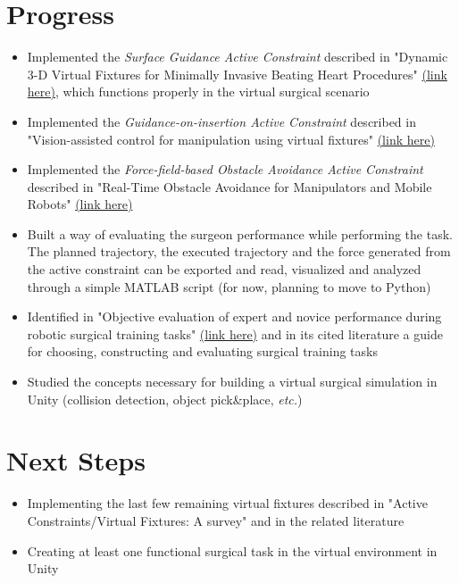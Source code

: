 \documentclass{article}
\begin{document}
\section*{Progress}
    \begin{itemize}
        \item Implemented the \textit{Surface Guidance Active Constraint}
        described in "Dynamic 3-D Virtual Fixtures for Minimally Invasive
        Beating Heart Procedures"
        \href{https://ieeexplore.ieee.org/document/4579344}{(link here)}, which
        functions properly in the virtual surgical scenario
        \item Implemented  the \textit{Guidance-on-insertion Active Constraint}
        described in "Vision-assisted control for manipulation using virtual
        fixtures" \href{https://ieeexplore.ieee.org/document/1362691}{(link
        here)}
        \item Implemented  the \textit{Force-field-based Obstacle Avoidance 
         Active Constraint}
         described in "Real-Time Obstacle Avoidance for Manipulators and Mobile
         Robots"
        \href{https://ieeexplore.ieee.org/document/1087247}{(link
        here)}
        \item Built a way of evaluating the surgeon performance while performing
        the task. The planned trajectory, the executed trajectory and the force
        generated from the active constraint can be exported and read, visualized
        and analyzed through a simple MATLAB script (for now, planning to move
        to Python)
        \item Identified in "Objective evaluation of expert and novice performance
        during robotic surgical training tasks"
        \href{https://link.springer.com/article/10.1007/s00464-008-9933-9}{(link
        here)} and in its cited literature a guide for choosing, constructing
        and evaluating surgical training tasks 
        \item Studied the concepts necessary for building a virtual surgical
        simulation in Unity (collision detection, object pick\&place, \textit{etc.})
    \end{itemize}
\section*{Next Steps}
    \begin{itemize}
        \item Implementing the last few remaining virtual fixtures described
        in "Active Constraints/Virtual Fixtures: A survey" and in the related literature
        \item Creating at least one functional surgical task in the virtual
        environment in Unity
    \end{itemize}
\newpage
\end{document}
